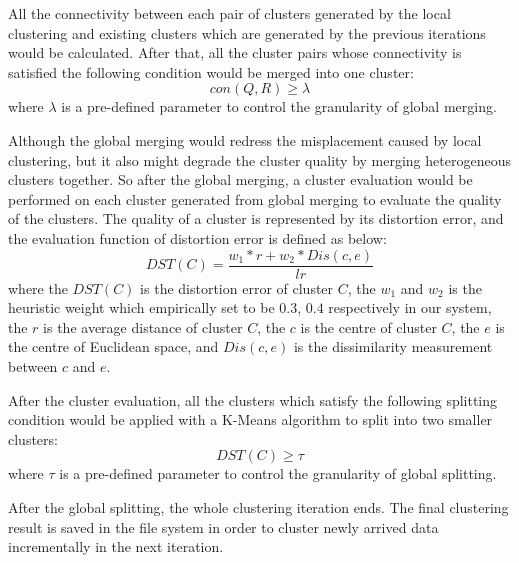 \documentclass[conference]{IEEEtran}
\begin{document}
All the connectivity between each pair of clusters generated by the local clustering and existing clusters which are generated by the previous iterations would be calculated. After that, all the cluster pairs whose connectivity is satisfied the following condition would be merged into one cluster:
\begin{equation}\label{eq_mergingCondition}
con(Q, R) \geq \lambda
\end{equation}
where $ \lambda $ is a pre-defined parameter to control the granularity of global merging.


Although the global merging would redress the misplacement caused by local clustering, but it also might degrade the cluster quality by merging heterogeneous clusters together. So after the global merging, a cluster evaluation would be performed on each cluster generated from global merging to evaluate the quality of the clusters. The quality of a cluster is represented by its distortion error, and the evaluation function of distortion error is defined as below:
\begin{equation}\label{eq_quality}
DST(C) = \frac{w_1 * r + w_2 * Dis(c, e )}{lr}
\end{equation}
where the $ DST(C) $ is the distortion error of cluster $ C $, the $ w_1 $ and $ w_2 $ is the heuristic weight which empirically set to be $ 0.3 $, $ 0.4 $ respectively in our system, the $ r $ is the average distance of cluster $ C $, the $ c $ is the centre of cluster $ C $, the $ e $ is the centre of Euclidean space, and $ Dis(c, e) $ is the dissimilarity measurement between $ c $ and $ e $. 


After the cluster evaluation, all the clusters which satisfy the following splitting condition would be applied with a K-Means algorithm to split into two smaller clusters:
\begin{equation}\label{eq_splittingCondition}
DST(C) \geq \tau
\end{equation} 
where $ \tau $ is a pre-defined parameter to control the granularity of global splitting. 


After the global splitting, the whole clustering iteration ends. The final clustering result is saved in the file system in order to cluster newly arrived data incrementally in the next iteration.
\end{document}
